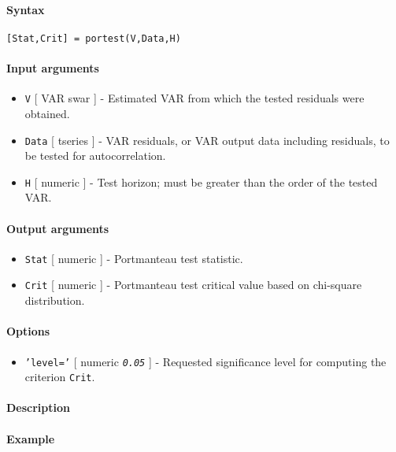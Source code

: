 


	\paragraph{Syntax}

\begin{verbatim}
[Stat,Crit] = portest(V,Data,H)
\end{verbatim}

\paragraph{Input arguments}

\begin{itemize}
\item
  \texttt{V} {[} VAR \textbar{} swar {]} - Estimated VAR from which the
  tested residuals were obtained.
\item
  \texttt{Data} {[} tseries {]} - VAR residuals, or VAR output data
  including residuals, to be tested for autocorrelation.
\item
  \texttt{H} {[} numeric {]} - Test horizon; must be greater than the
  order of the tested VAR.
\end{itemize}

\paragraph{Output arguments}

\begin{itemize}
\item
  \texttt{Stat} {[} numeric {]} - Portmanteau test statistic.
\item
  \texttt{Crit} {[} numeric {]} - Portmanteau test critical value based
  on chi-square distribution.
\end{itemize}

\paragraph{Options}

\begin{itemize}
\itemsep1pt\parskip0pt
\item
  \texttt{'level='} {[} numeric \textbar{} \emph{\texttt{0.05}} {]} -
  Requested significance level for computing the criterion
  \texttt{Crit}.
\end{itemize}

\paragraph{Description}

\paragraph{Example}


